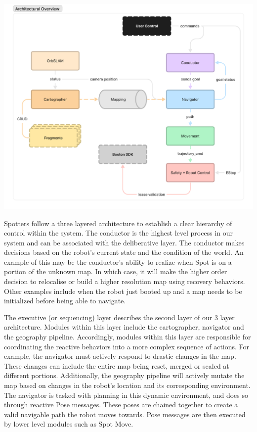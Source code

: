 \documentclass[10pt,english]{article}
\begin{document}
\begin{center}
    \includegraphics[width=\textwidth]{images/Architectural Overview.png}
\end{center}

\clearpage

Spotters follow a three layered architecture to establish a clear hierarchy of control within the system. The conductor is the highest level process in our system and can be associated with the deliberative layer. The conductor makes decisions based on the robot's current state and the condition of the world. An example of this may be the conductor’s ability to realize when Spot is on a portion of the unknown map. In which case, it will make the higher order decision to relocalise or build a higher resolution map using recovery behaviors. Other examples include when the robot just booted up and a map needs to be initialized before being able to navigate.

The executive (or sequencing) layer describes the second layer of our 3 layer architecture. Modules within this layer include the cartographer, navigator and the geography pipeline. Accordingly, modules within this layer are responsible for coordinating the reactive behaviors into a more complex sequence of actions. For example, the navigator must actively respond to
drastic changes in the map. These changes can include the entire map being reset, merged or scaled at different portions. Additionally, the geography pipeline will actively mutate the map based on changes in the robot's location and its corresponding environment. The navigator is tasked with planning in this dynamic environment, and does so through reactive Pose messages. These poses are chained together to create a valid navigable path the robot moves towards. Pose messages are then executed by lower level modules such as Spot Move.
\end{document}

